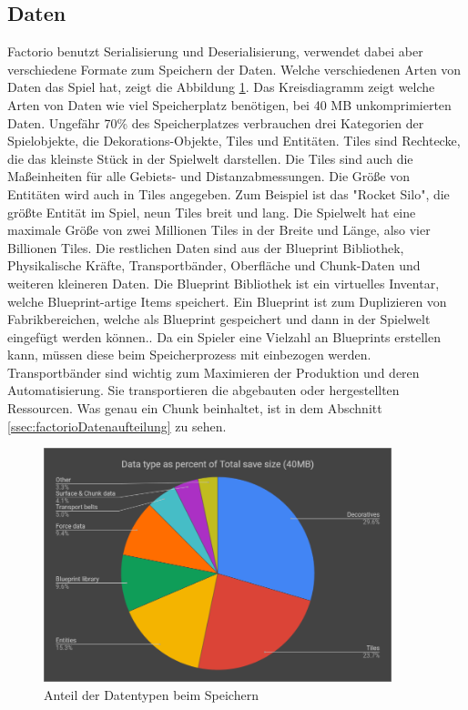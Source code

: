\subsection{Daten}
Factorio benutzt Serialisierung und Deserialisierung, verwendet dabei aber verschiedene Formate zum Speichern der Daten. Welche verschiedenen Arten von Daten das Spiel hat, zeigt die Abbildung \ref{fig:factorioSaveStatistic}. Das Kreisdiagramm zeigt welche Arten von Daten wie viel Speicherplatz benötigen, bei 40 MB unkomprimierten Daten. Ungefähr 70\% des Speicherplatzes verbrauchen drei Kategorien der Spielobjekte, die Dekorations-Objekte, Tiles und Entitäten. Tiles sind Rechtecke, die das kleinste Stück in der Spielwelt darstellen. Die Tiles sind auch die Maßeinheiten für alle Gebiets- und Distanzabmessungen. Die Größe von Entitäten wird auch in Tiles angegeben. Zum Beispiel ist das "Rocket Silo", die größte Entität im Spiel, neun Tiles breit und lang. Die Spielwelt hat eine maximale Größe von zwei Millionen Tiles in der Breite und Länge, also vier Billionen Tiles.\cite{factorioMapStructure} Die restlichen Daten sind aus der Blueprint Bibliothek, Physikalische Kräfte, Transportbänder, Oberfläche und Chunk-Daten und weiteren kleineren Daten.\cite{factorioFridayFacts270} Die Blueprint Bibliothek ist ein virtuelles Inventar, welche Blueprint-artige Items speichert.\cite{factorioBlueprintLibrary} Ein Blueprint ist zum Duplizieren von Fabrikbereichen, welche als Blueprint gespeichert und dann in der Spielwelt eingefügt werden können.\cite{factorioBlueprint}. Da ein Spieler eine Vielzahl an Blueprints erstellen kann, müssen diese beim Speicherprozess mit einbezogen werden. Transportbänder sind wichtig zum Maximieren der Produktion und deren Automatisierung. Sie transportieren die abgebauten oder hergestellten Ressourcen. Was genau ein Chunk beinhaltet, ist in dem Abschnitt \ref{ssec:factorioDatenaufteilung} zu sehen.

\begin{figure}[htp]
    \centering
    \includegraphics[width=0.9\textwidth]{images/factorio_save_statistic.png}
    \caption{Anteil der Datentypen beim Speichern\cite{factorioFridayFacts270}}
    \label{fig:factorioSaveStatistic}
\end{figure}



